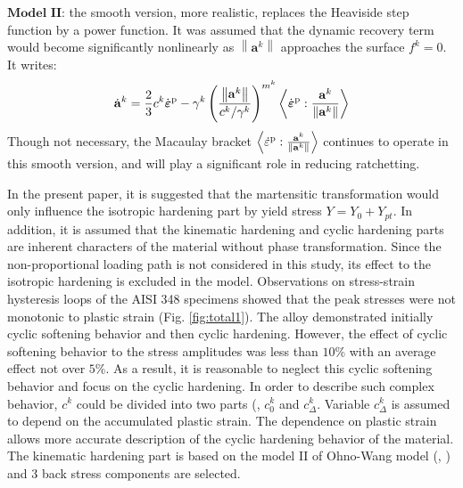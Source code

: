 \documentclass[final,5p,times,onecolumn,10pt,sort&compress]{elsarticle}
\newcommand{\bfepsilon}{{\mbox{\boldmath{$\varepsilon$}}}}
\begin{document}
$\textbf{Model II}$: the smooth version, more realistic, replaces the Heaviside step function by a power function. It was assumed that the dynamic recovery term would become significantly nonlinearly as $\left\|\mathbf{a}^{k}\right\|$ approaches the surface $f^{k}=0$. It writes:
\begin{equation}\label{eq:Ohno Wang model 2}
\dot{\mathbf{a}}^{k}=\frac{2}{3} c^{k} \dot{\bfepsilon}^{\mathrm{p}}-\gamma^{k}\left(\frac{\left\|\mathbf{a}^{k}\right\|}{c^{k} / \gamma^{k}}\right)^{m^{k}}\left \langle \dot{\bfepsilon}^{\rm p}: \frac{\mathbf{a}^{k}}{\left \| \mathbf{a}^{k} \right \|}\right \rangle
\end{equation}
Though not necessary, the Macaulay bracket $\left\langle\dot{\varepsilon}^{\rm p} : \frac{\mathbf{a}^{k}}{\left\|\mathbf{a}^{k}\right\|}\right\rangle$ continues to operate in this smooth version, and will play a significant role in reducing ratchetting.

In the present paper, it is suggested that the martensitic transformation would only influence the isotropic hardening part by yield stress $Y=Y_{0}+Y_{pt}$. In addition, it is assumed that the kinematic hardening and cyclic hardening parts are inherent characters of the material without phase transformation. Since the non-proportional loading path is not considered in this study, its effect to the isotropic hardening is excluded in the model. Observations on stress-strain hysteresis loops of the AISI 348 specimens showed that the peak stresses were not monotonic to plastic strain (Fig. \ref{fig:total1}). The alloy demonstrated initially cyclic softening behavior and then cyclic hardening. However, the effect of cyclic softening behavior to the stress amplitudes was less than $10\%$ with an average effect not over $5\%$. As a result, it is reasonable to neglect this cyclic softening behavior and focus on the cyclic hardening. In order to describe such complex behavior, $c^{k}$ could be divided into two parts (\citeauthor{Fang2015Cyclic}, $c_{0}^{k}$ and $c_{\Delta}^{k}$. Variable $c_{\Delta}^{k}$ is assumed to depend on the accumulated plastic strain. The dependence on plastic strain allows more accurate description of the cyclic hardening behavior of the material. The kinematic hardening part is based on the model II of Ohno-Wang model (\citeauthor{Ohno1993Kinematic}, \citeyear{Ohno1993Kinematic}) and 3 back stress components are selected.
\end{document}
